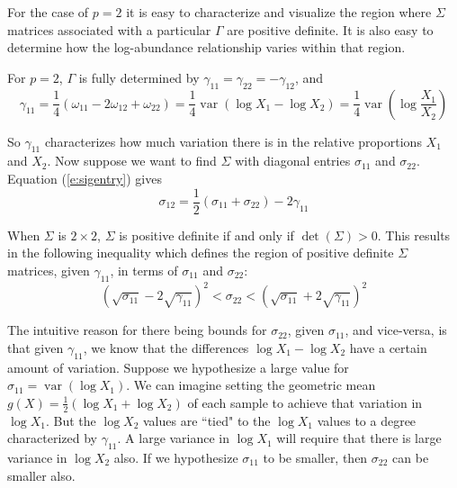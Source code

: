 \documentclass[10pt]{article}
\newcommand{\var}{\operatorname{var}}
\begin{document}
For the case of $p = 2$ it is easy to characterize and visualize the region where $\Sigma$ matrices associated with a particular $\Gamma$ are positive definite. It is also easy to determine how the log-abundance relationship varies within that region.

For $p = 2$, $\Gamma$ is fully determined by $\gamma_{11} = \gamma_{22} = -\gamma_{12}$, and
\begin{equation}
\gamma_{11} = \frac{1}{4}(\omega_{11} - 2\omega_{12} + \omega_{22}) = \frac{1}{4}\var(\log X_1 - \log X_2) = \frac{1}{4} \var\left( \log \frac{X_1}{X_2} \right)
\end{equation}

So $\gamma_{11}$ characterizes how much variation there is in the relative proportions $X_1$ and $X_2$. Now suppose we want to find $\Sigma$ with diagonal entries $\sigma_{11}$ and $\sigma_{22}$. Equation (\ref{e:sigentry}) gives
\begin{equation}
\label{e:sig12}
\sigma_{12} = \frac{1}{2}(\sigma_{11} + \sigma_{22}) - 2\gamma_{11}
\end{equation}

When $\Sigma$ is $2 \times 2$, $\Sigma$ is positive definite if and only if $\det(\Sigma) > 0$. This results in the following inequality which defines the region of positive definite $\Sigma$ matrices, given $\gamma_{11}$, in terms of $\sigma_{11}$ and $\sigma_{22}$:
\begin{equation}
\left( \sqrt{\sigma_{11}} - 2\sqrt{\gamma_{11}} \right)^2 < \sigma_{22} < \left( \sqrt{\sigma_{11}} + 2\sqrt{\gamma_{11}} \right)^2
\end{equation}

The intuitive reason for there being bounds for $\sigma_{22}$, given $\sigma_{11}$, and vice-versa, is that given $\gamma_{11}$, we know that the differences $\log X_1 - \log X_2$ have a certain amount of variation. Suppose we hypothesize a large value for $\sigma_{11} = \var(\log X_1)$. We can imagine setting the geometric mean $g(X) = \frac{1}{2}(\log X_1 + \log X_2)$ of each sample to achieve that variation in $\log X_1$. But the $\log X_2$ values are ``tied" to the $\log X_1$ values to a degree characterized by $\gamma_{11}$. A large variance in $\log X_1$ will require that there is large variance in $\log X_2$ also. If we hypothesize $\sigma_{11}$ to be smaller, then $\sigma_{22}$ can be smaller also.
\end{document}
